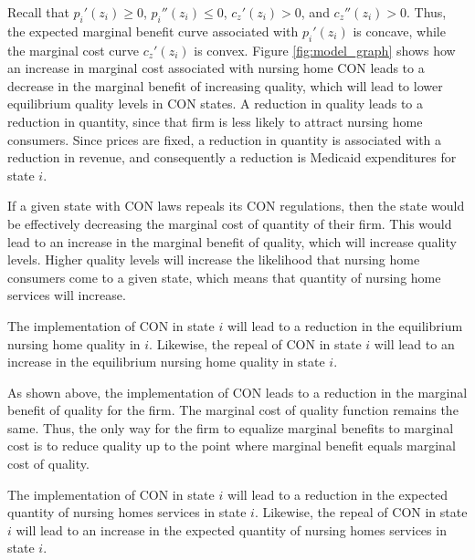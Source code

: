 \documentclass[../Main.tex]{subfiles}
\begin{document}
Recall that $p_{i}'(z_i)\geq 0$, $p_{i}''(z_i) \leq 0$, $c_z'(z_i)>0$, and $c_z''(z_i)>0$. Thus, the expected marginal benefit curve associated with $p_{i}'(z_i)$ is concave, while the marginal cost curve $c_z'(z_i)$ is convex. Figure \ref{fig:model_graph} shows how an increase in marginal cost associated with nursing home CON leads to a decrease in the marginal benefit of increasing quality, which will lead to lower equilibrium quality levels in CON states. A reduction in quality leads to a reduction in quantity, since that firm is less likely to attract nursing home consumers. Since prices are fixed, a reduction in quantity is associated with a reduction in revenue, and consequently a reduction is Medicaid expenditures for state $i$. 

If a given state with CON laws repeals its CON regulations, then the state would be effectively decreasing the marginal cost of quantity of their firm. This would lead to an increase in the marginal benefit of quality, which will increase quality levels. Higher quality levels will increase the likelihood that nursing home consumers come to a given state, which means that quantity of nursing home services will increase.



\begin{Proposition}\label{prop1}
The implementation of CON in state $i$ will lead to a reduction in the equilibrium nursing home quality in $i$. Likewise, the repeal of CON in state $i$ will lead to an increase in the equilibrium nursing home quality in state $i$. 
\end{Proposition}


As shown above, the implementation of CON leads to a reduction in the marginal benefit of quality for the firm. The marginal cost of quality function remains the same. Thus, the only way for the firm to equalize marginal benefits to marginal cost is to reduce quality up to the point where marginal benefit equals marginal cost of quality. 

\begin{Proposition}\label{prop2}
The implementation of CON in state $i$ will lead to a reduction in the expected quantity of nursing homes services in state $i$. Likewise, the repeal of CON in state $i$ will lead to an increase in the expected quantity of nursing homes services in state $i$. 
\end{Proposition}
\end{document}
